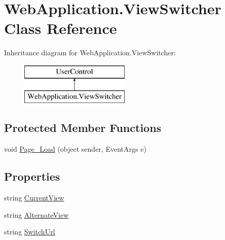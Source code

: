 \hypertarget{classWebApplication_1_1ViewSwitcher}{}\section{Web\+Application.\+View\+Switcher Class Reference}
\label{classWebApplication_1_1ViewSwitcher}
Inheritance diagram for Web\+Application.\+View\+Switcher\+:\begin{figure}[H]
\begin{center}
\leavevmode
\includegraphics[height=2.000000cm]{de/de7/classWebApplication_1_1ViewSwitcher}
\end{center}
\end{figure}
\subsection*{Protected Member Functions}
\begin{DoxyCompactItemize}
\item 
void \mbox{\hyperlink{classWebApplication_1_1ViewSwitcher_a9bb1df92a074f9fd0b98960aa849e389}{Page\+\_\+\+Load}} (object sender, Event\+Args e)
\end{DoxyCompactItemize}
\subsection*{Properties}
\begin{DoxyCompactItemize}
\item 
string \mbox{\hyperlink{classWebApplication_1_1ViewSwitcher_a65a2e1bbc4abb8488ed59abc6904f47a}{Current\+View}}
\item 
string \mbox{\hyperlink{classWebApplication_1_1ViewSwitcher_a5d5a902ce48161faaae1f4d7f087fc41}{Alternate\+View}}
\item 
string \mbox{\hyperlink{classWebApplication_1_1ViewSwitcher_aa6e83ed2a4b0c20c680600d42d3aed05}{Switch\+Url}}
\end{DoxyCompactItemize}


